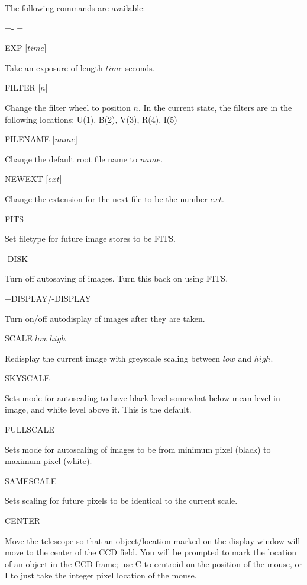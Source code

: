 \documentclass[10pt]{report}
\renewcommand{\[}{\begin{eqnarray}}
\renewcommand{\]}{\end{eqnarray}}
\newenvironment{hanging}{
	\begin{list}{}{
		\labelsep=0pt
		\labelwidth=0pt
		\listparindent=0pt
		\itemindent=-\leftmargini
		\leftmargin=\leftmargini
	}
}{
	\end{list}
}
\begin{document}
The following commands are available:
\begin{hanging}
\item{EXP [$time$]}

Take an exposure of length $time$ seconds.

\item{FILTER [$n$]}

Change the filter wheel to position $n$. In the current state, the filters
are in the following locations: U(1), B(2), V(3), R(4), I(5)

\item{FILENAME [$name$]}

Change the default root file name to $name$.

\item{NEWEXT [$ext$]}

Change the extension for the next file to be the number $ext$.

\item{FITS}

Set filetype for future image stores to be FITS.

\item{-DISK}

Turn off autosaving of images. Turn this back on using FITS.

\item{+DISPLAY/-DISPLAY}

Turn on/off autodisplay of images after they are taken.

\item{SCALE $low\ high$}

Redisplay the current image with greyscale scaling between $low$ and $high$.

\item{SKYSCALE}

Sets mode for autoscaling to have black level somewhat below mean level in
image, and white level above it. This is the default.

\item{FULLSCALE}

Sets mode for autoscaling of images to be from minimum pixel (black) to
maximum pixel (white).

\item{SAMESCALE}

Sets scaling for future pixels to be identical to the current scale.

\item{CENTER}

Move the telescope so that an object/location marked on the display window
will move to the center of the CCD field. You will be prompted to mark the
location of an object in the CCD frame; use C to centroid on the position
of the mouse, or I to just take the integer pixel location of the mouse.


\end{hanging}
\end{document}
